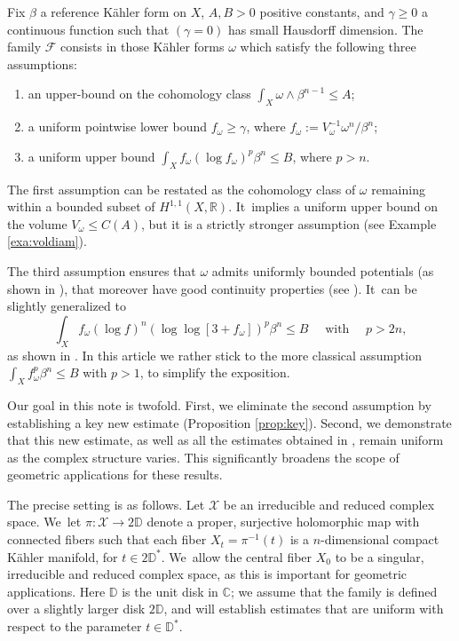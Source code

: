 \documentclass[10pt]{amsart}
\theoremstyle{definition}
\newcommand{\C}{\mathbb C}
\newcommand{\R}{\mathbb R}
\begin{document}
Fix $\beta$ a reference Kähler form on $X$,
$A,B>0$ positive constants, and $\gamma \geq 0$ a continuous function such that $(\gamma =0)$ has small Hausdorff dimension.
The family ${\mathcal F}$ consists in those Kähler forms $\omega$
which satisfy the following three assumptions:
\begin{enumerate}
\item an upper-bound on the cohomology class $\int_X \omega \wedge \beta^{n-1} \leq A$;
\item a uniform pointwise lower bound $f_{\omega} \geq \gamma$, where
$f_{\omega}:=V_{\omega}^{-1}\omega^n/\beta^n$;
\item a uniform upper bound $\int_X f_{\omega} (\log f_{\omega})^p \beta^n \leq B$, where $p>n$.
\end{enumerate}

The first assumption can be restated as the cohomology class of $\omega$ remaining within a bounded subset of $H^{1,1}(X,\R)$. It~implies a uniform upper bound on the volume $V_{\omega} \leq C(A)$, but it is a strictly stronger assumption
(see Example \ref{exa:voldiam}).

The third assumption ensures that $\omega$ admits uniformly bounded potentials
(as shown in \cite{Kol98,EGZ08,DP10}), that moreover
have good continuity properties (see \cite{Kol08,DDGHKZ14,GPTW21,GGZ23}). It~can be slightly generalized to
\[
\int_X f_{\omega} (\log f)^n (\log \log [3+f_{\omega}])^p \beta^n \leq B
\quad \text{ with } \quad
p>2n,
\]
as shown in \cite{GGZ23}. In this article we rather stick to the more classical assumption
$\int_X f_{\omega}^p \beta^n \leq B$ with $p>1$, to simplify the exposition.

Our goal in this note is twofold.
First, we eliminate the second assumption by establishing a key new estimate (Proposition \ref{prop:key}).
Second, we demonstrate that this new estimate, as well as all the estimates obtained in \cite{GPS22,GPSS22,GPSS23},
remain uniform as the complex structure varies.
This significantly broadens the scope of geometric applications for these results.

The precise setting is as follows.
Let $\mathcal{X}$ be an irreducible and reduced complex space. We~let $\pi:{\mathcal X} \rightarrow 2 \mathbb D$
denote a proper, surjective holomorphic map with connected fibers such that each fiber $X_t=\pi^{-1}(t)$ is a $n$-dimensional
compact Kähler manifold, for $t\in 2 \mathbb D^*$. We~allow the central fiber $X_0$ to be a singular, irreducible and reduced complex space, as this is important for geometric applications.
Here $\mathbb D$ is the unit disk in $\C$; we assume that the family is defined over a slightly larger disk
$2 \mathbb D$, and will establish estimates that are uniform with respect to the parameter $t \in \mathbb D^*$.
\end{document}
